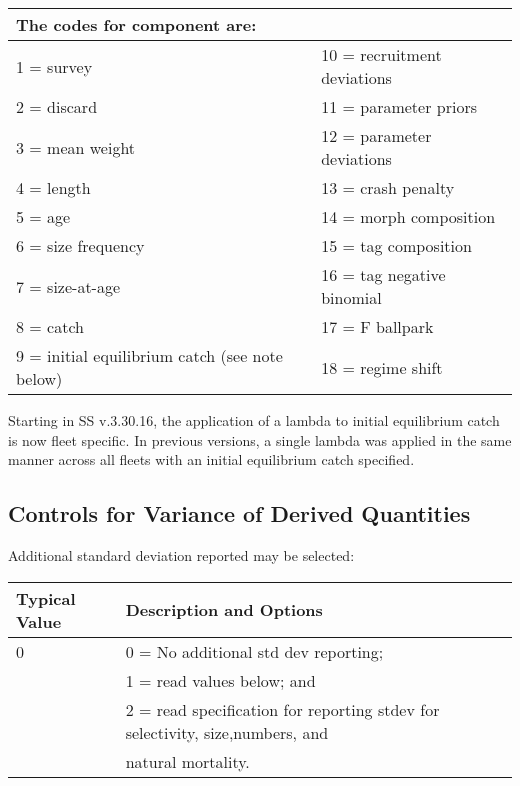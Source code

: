 \begin{center}
	\begin{longtable}{ p{7.5cm} p{7.5cm} }
		\multicolumn{2}{l}{The codes for component are:}\\
		\hline
		1 = survey  				   & 10 = recruitment deviations \Tstrut\\	
		2 = discard 				   & 11 = parameter priors\\		
		3 = mean weight 			   & 12 = parameter deviations\\	
		4 = length 					   & 13 = crash penalty\\		
		5 = age 					   & 14 = morph composition\\
		6 = size frequency  		   & 15 = tag composition\\		
		7 = size-at-age 			   & 16 = tag negative binomial\\
		8 = catch 					   & 17 = F ballpark\\		
		9 = initial equilibrium catch (see note below) & 18 = regime shift \Bstrut\\
		\hline
	\end{longtable}
\end{center}

Starting in SS v.3.30.16, the application of a lambda to initial equilibrium catch is now fleet specific.  In previous versions, a single lambda was applied in the same manner across all fleets with an initial equilibrium catch specified.

\pagebreak

\subsection{Controls for Variance of Derived Quantities}
Additional standard deviation reported may be selected:

\begin{longtable}{p{1.1cm} p{1.4cm} p{1.2cm} p{1.2cm} p{1.3cm} p{1.6cm} p{1.4cm} p{1.4cm} p{1.4cm}}

	\hline
	\multicolumn{3}{l}{Typical Value} & \multicolumn{6}{l}{Description and Options}\Tstrut\Bstrut\\
	\hline
	\endfirsthead


	\multicolumn{3}{l}{0} & \multicolumn{6}{l}{0 = No additional std dev reporting;} \Tstrut\\
	\multicolumn{3}{l}{ } & \multicolumn{6}{l}{1 = read values below; and}\Bstrut\\
	\multicolumn{3}{l}{ } & \multicolumn{6}{l}{2 = read specification for reporting stdev for selectivity, size,numbers, and }\Bstrut\\
	\multicolumn{3}{l}{ } & \multicolumn{6}{l}{natural mortality.}\Bstrut\\
	\hline

\end{longtable}

